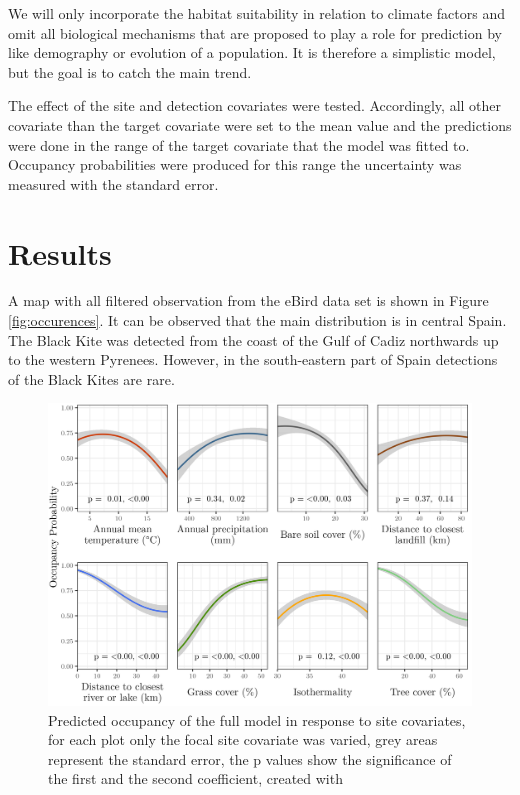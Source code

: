 \begin{multicols}{2}
We will only incorporate the habitat suitability in relation to climate factors and omit all biological mechanisms that are proposed to play a role for prediction by \textcite{Urban2016} like demography or evolution of a population. It is therefore a simplistic model, but the goal is to catch the main trend.

The effect of the site and detection covariates were tested. Accordingly, all other covariate than the target covariate were set to the mean value and the predictions were done in the range of the target covariate that the model was fitted to. Occupancy probabilities were produced for this range the uncertainty was measured with the standard error.



\section{Results}
A map with all filtered observation from the eBird data set is shown in Figure \ref{fig:occurences}. It can be observed that the main distribution is in central Spain. The Black Kite was detected from the coast of the Gulf of Cadiz northwards up to the western Pyrenees. However, in the south-eastern part of Spain detections of the Black Kites are rare.  

\begin{figure}[t]
	\centering
	\includegraphics[width=\linewidth]{img/site_covariates}
	\caption{Predicted occupancy of the full model in response to site covariates, for each plot only the focal site covariate was varied, grey areas represent the standard error, the p values show the significance of the first and the second coefficient, created with \textcite{ggplot2}}
	\label{fig:site}
\end{figure}


\end{multicols}
